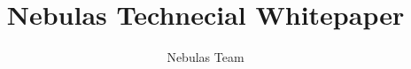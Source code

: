 \documentclass[10pt]{article}
\begin{document}
\title{Nebulas Technecial Whitepaper}
\author{Nebulas Team}

\maketitle

\newpage

\tableofcontents












\newpage
\printbibliography

%
\end{document}
